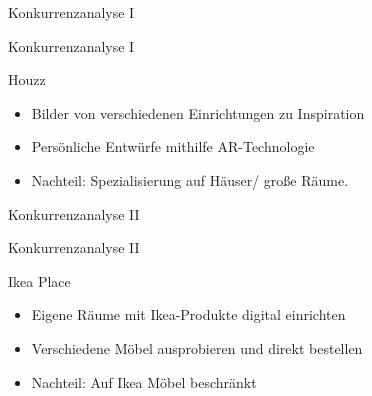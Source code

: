 \documentclass[presentation,bigger,aspectratio=169]{beamer}
\begin{document}
\begin{frame}[label={sec:org0d4c6ec}]{Konkurrenzanalyse I}
\end{frame}

\begin{frame}[label={sec:orgf559e44}]{Konkurrenzanalyse I}
\begin{block}{Houzz}
\begin{itemize}
\item Bilder von verschiedenen Einrichtungen zu Inspiration
\item Persönliche Entwürfe mithilfe AR-Technologie
\item Nachteil: Spezialisierung auf Häuser/ große Räume.
\end{itemize}
\end{block}
\end{frame}
\begin{frame}[label={sec:org8172078}]{Konkurrenzanalyse II}
\end{frame}
\begin{frame}[label={sec:org7c4b393}]{Konkurrenzanalyse II}
\begin{block}{Ikea Place}
\begin{itemize}
\item Eigene Räume mit Ikea-Produkte digital einrichten
\item Verschiedene Möbel ausprobieren und direkt bestellen
\item Nachteil: Auf Ikea Möbel beschränkt
\end{itemize}
\end{block}
\end{frame}
\end{document}
